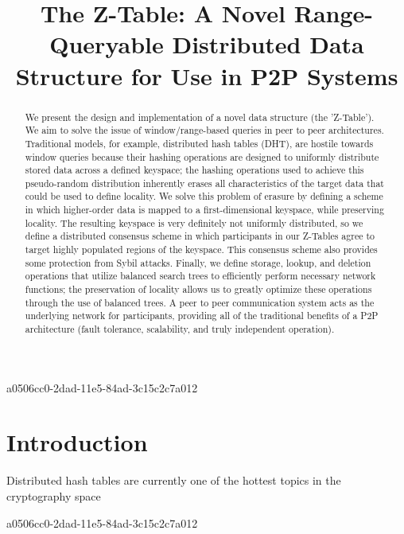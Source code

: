 \documentclass[12pt]{article}
\title{The Z-Table: A Novel Range-Queryable Distributed Data Structure for Use in P2P Systems}
\begin{document}
\maketitle
a0506cc0-2dad-11e5-84ad-3c15c2c7a012
\begin{abstract}
We present the design and implementation of a novel data structure (the 'Z-Table'). We aim to solve the issue of window/range-based queries in peer to peer architectures. Traditional models, for example,  distributed hash tables (DHT), are hostile towards window queries because their hashing operations are designed to uniformly distribute stored data across a defined keyspace; the hashing operations used to achieve this pseudo-random distribution inherently erases all characteristics of the target data that could be used to define locality. We solve this problem of erasure by defining a scheme in which higher-order data is mapped to a first-dimensional keyspace, while preserving locality. The resulting keyspace is very definitely not uniformly distributed, so we define a distributed consensus scheme in which participants in our Z-Tables agree to target highly populated regions of the keyspace. This consensus scheme also provides some protection from Sybil attacks. Finally, we define storage, lookup, and deletion operations that utilize balanced search trees to efficiently perform necessary network functions; the preservation of locality allows us to greatly optimize these operations through the use of balanced trees. A peer to peer communication system acts as the underlying network for participants, providing all of the traditional benefits of a P2P architecture (fault tolerance, scalability, and truly independent operation).
\end{abstract}


\newpage
\section{Introduction}
Distributed hash tables are currently one of the hottest topics in the cryptography space~\cite{Stoica:2001dj,Rowstron:2001ea,Ratnasamy:2001wn}

a0506cc0-2dad-11e5-84ad-3c15c2c7a012\printbibliography
\end{document}
